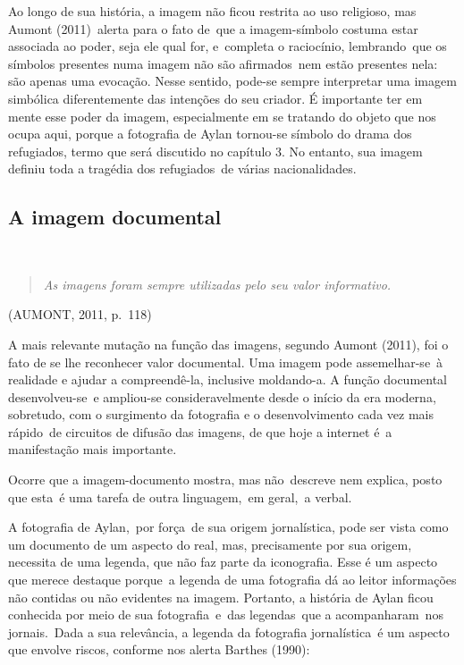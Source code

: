 \documentclass[
  letterpaper,
]{scrbook}
\begin{document}
Ao longo de sua história, a imagem não ficou restrita ao uso religioso,
mas Aumont (2011)~alerta para o fato de~que a imagem-símbolo costuma
estar associada ao poder, seja ele qual for, e~completa o raciocínio,
lembrando~que os símbolos presentes numa imagem não são afirmados~nem
estão presentes nela: são apenas uma evocação. Nesse sentido, pode-se
sempre interpretar uma imagem simbólica diferentemente das intenções do
seu criador. É importante ter em mente esse poder da imagem,
especialmente em se tratando do objeto que nos ocupa aqui, porque a
fotografia de Aylan tornou-se símbolo do drama dos refugiados, termo que
será discutido no capítulo 3. No entanto, sua imagem definiu toda a
tragédia dos refugiados~de várias nacionalidades.~

\hypertarget{a-imagem-documental}{%
\subsection{A imagem documental~}\label{a-imagem-documental}}

~

\begin{quote}
\emph{As imagens foram sempre utilizadas pelo seu valor informativo.}
\end{quote}

(AUMONT, 2011, p.~118) ~

A mais relevante mutação na função das imagens, segundo Aumont (2011),
foi o fato de se lhe reconhecer valor documental. Uma imagem pode
assemelhar-se~à realidade e ajudar a compreendê-la, inclusive
moldando-a. A função documental desenvolveu-se~e ampliou-se
consideravelmente desde o início da era moderna, sobretudo, com o
surgimento da fotografia e o desenvolvimento cada vez mais rápido~de
circuitos de difusão das imagens, de que hoje a internet é~a
manifestação mais importante.~

Ocorre que a imagem-documento mostra, mas não~descreve nem explica,
posto que esta~é uma tarefa de outra linguagem,~em geral,~a verbal.~

A fotografia de Aylan,~por força~de sua origem jornalística, pode ser
vista como um documento de um aspecto do real, mas, precisamente por sua
origem, necessita de uma legenda, que não faz parte da iconografia. Esse
é um aspecto que merece destaque porque~a legenda de uma fotografia dá
ao leitor informações não contidas ou não evidentes na imagem. Portanto,
a história de Aylan ficou conhecida por meio de sua fotografia~e~das
legendas~que a acompanharam~nos jornais.~Dada a sua relevância, a
legenda da fotografia jornalística~é um aspecto que envolve riscos,
conforme nos alerta Barthes (1990):~ ~
\end{document}
